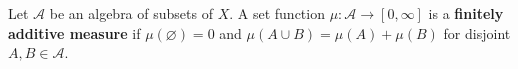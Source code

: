 Let $\mathcal{A}$ be an algebra of subsets of $X$. A set function $\mu : \mathcal{A} \to [0, \infty]$ is a \textbf{finitely additive measure} if $\mu(\varnothing) = 0$ and $\mu(A \cup B) = \mu(A) + \mu(B)$ for disjoint $A, B \in \mathcal{A}$.
